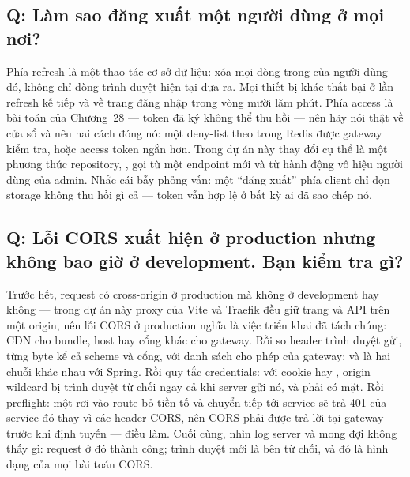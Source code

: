 \subsection*{Q: Làm sao đăng xuất một người dùng ở mọi nơi?}

Phía refresh là một thao tác cơ sở dữ liệu: xóa mọi dòng trong
 của người dùng đó, không chỉ dòng trình duyệt
hiện tại đưa ra. Mọi thiết bị khác thất bại ở lần refresh kế tiếp và
về trang đăng nhập trong vòng mười lăm phút. Phía access là bài toán
của Chương~28 --- token đã ký không thể thu hồi --- nên hãy nói thật về
cửa sổ và nêu hai cách đóng nó: một deny-list theo  trong
Redis được gateway kiểm tra, hoặc access token ngắn hơn. Trong dự án
này thay đổi cụ thể là một phương thức repository,
, gọi từ một endpoint
 mới và từ hành động vô hiệu người dùng của
admin. Nhắc cái bẫy phỏng vấn: một ``đăng xuất'' phía client chỉ dọn
storage không thu hồi gì cả --- token vẫn hợp lệ ở bất kỳ ai đã sao
chép nó.

\subsection*{Q: Lỗi CORS xuất hiện ở production nhưng không bao giờ ở development. Bạn kiểm tra gì?}

Trước hết, request có cross-origin ở production mà không ở development
hay không --- trong dự án này proxy của Vite và Traefik đều giữ trang
và API trên một origin, nên lỗi CORS ở production nghĩa là việc triển
khai đã tách chúng: CDN cho bundle, host hay cổng khác cho gateway. Rồi
so header  trình duyệt gửi, từng byte kể cả scheme và
cổng, với danh sách cho phép của gateway; 
và  là hai chuỗi khác nhau với Spring.
Rồi quy tắc credentials: với cookie hay ,
origin wildcard bị trình duyệt từ chối ngay cả khi server gửi nó, và
 phải có mặt. Rồi
preflight: một  rơi vào route bỏ tiền tố và chuyển tiếp
tới service sẽ trả 401 của service đó thay vì các header CORS, nên CORS
phải được trả lời tại gateway trước khi định tuyến --- điều
 làm. Cuối cùng, nhìn log server và mong đợi không
thấy gì: request ở đó thành công; trình duyệt mới là bên từ chối, và đó
là hình dạng của mọi bài toán CORS.

